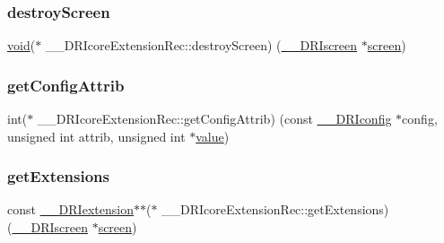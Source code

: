 \mbox{\label{struct_____d_r_icore_extension_rec_adcd287b6c4009b4d8e01bac36fb0f09b}} 
\subsubsection{\texorpdfstring{destroy\+Screen}{destroyScreen}}
{\footnotesize\ttfamily \hyperlink{_s_d_l__opengles2__gl2ext_8h_ae5d8fa23ad07c48bb609509eae494c95}{void}($\ast$ \+\_\+\+\_\+\+D\+R\+Icore\+Extension\+Rec\+::destroy\+Screen) (\hyperlink{dri__interface_8h_a9961b01d421ee1fd6ed3c05acc9ca561}{\+\_\+\+\_\+\+D\+R\+Iscreen} $\ast$\hyperlink{cad_8h_ae04e09e4e3831bfc1632c509ae37dcec}{screen})}

\mbox{\label{struct_____d_r_icore_extension_rec_af06eab75defdb8ffe7b61d4cc975ffc3}} 
\subsubsection{\texorpdfstring{get\+Config\+Attrib}{getConfigAttrib}}
{\footnotesize\ttfamily int($\ast$ \+\_\+\+\_\+\+D\+R\+Icore\+Extension\+Rec\+::get\+Config\+Attrib) (const \hyperlink{dri__interface_8h_aeac81999efbbf8b1d6886338e3ea24d9}{\+\_\+\+\_\+\+D\+R\+Iconfig} $\ast$config, unsigned int attrib, unsigned int $\ast$\hyperlink{glcorearb_8h_a8ad81492d410ff2ac11f754f4042150f}{value})}

\mbox{\label{struct_____d_r_icore_extension_rec_a410e0cf43ceb7137f9cdacae1f9a7a41}} 
\subsubsection{\texorpdfstring{get\+Extensions}{getExtensions}}
{\footnotesize\ttfamily const \hyperlink{dri__interface_8h_a4e0a61c8ece00d2b2c6792a9a1b55385}{\+\_\+\+\_\+\+D\+R\+Iextension}$\ast$$\ast$($\ast$ \+\_\+\+\_\+\+D\+R\+Icore\+Extension\+Rec\+::get\+Extensions) (\hyperlink{dri__interface_8h_a9961b01d421ee1fd6ed3c05acc9ca561}{\+\_\+\+\_\+\+D\+R\+Iscreen} $\ast$\hyperlink{cad_8h_ae04e09e4e3831bfc1632c509ae37dcec}{screen})}

